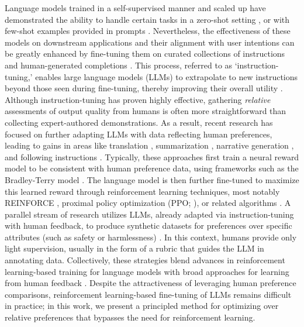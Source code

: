 Language models trained in a self-supervised manner and scaled up have demonstrated the ability to handle certain tasks in a zero-shot setting \citep{radford2019language}, or with few-shot examples provided in prompts \citep{gpt3,megatron,chowdhery2022palm}. Nevertheless, the effectiveness of these models on downstream applications and their alignment with user intentions can be greatly enhanced by fine-tuning them on curated collections of instructions and human-generated completions \citep{mishra-etal-2022-cross,sanh2022multitask,chung2022scaling,thoppilan2022lamda}. This process, referred to as `instruction-tuning,’ enables large language models (LLMs) to extrapolate to new instructions beyond those seen during fine-tuning, thereby improving their overall utility \citep{chung2022scaling}. Although instruction-tuning has proven highly effective, gathering \textit{relative} assessments of output quality from humans is often more straightforward than collecting expert-authored demonstrations. As a result, recent research has focused on further adapting LLMs with data reflecting human preferences, leading to gains in areas like translation \citep{kreutzer-etal-2018-reliability}, summarization \citep{stiennon2022learning,ziegler2020finetuning}, narrative generation \citep{ziegler2020finetuning}, and following instructions \citep{ouyang2022training,ramamurthy2023is}. Typically, these approaches first train a neural reward model to be consistent with human preference data, using frameworks such as the Bradley-Terry model \citep{bradley1952rankanalysis}. The language model is then further fine-tuned to maximize this learned reward through reinforcement learning techniques, most notably REINFORCE \citep{williams1992reinforce}, proximal policy optimization (PPO; \cite{schulman2017proximal}), or related algorithms \citep{ramamurthy2023is}. A parallel stream of research utilizes LLMs, already adapted via instruction-tuning with human feedback, to produce synthetic datasets for preferences over specific attributes (such as safety or harmlessness) \citep{bai2022constitutional}. In this context, humans provide only light supervision, usually in the form of a rubric that guides the LLM in annotating data. Collectively, these strategies blend advances in reinforcement learning-based training for language models \citep{Ranzato2015SequenceLT,paulus2018a,wu2018learning} with broad approaches for learning from human feedback \citep{christiano2017deep,kupcsik2018learning}. Despite the attractiveness of leveraging human preference comparisons, reinforcement learning-based fine-tuning of LLMs remains difficult in practice; in this work, we present a principled method for optimizing over relative preferences that bypasses the need for reinforcement learning.

